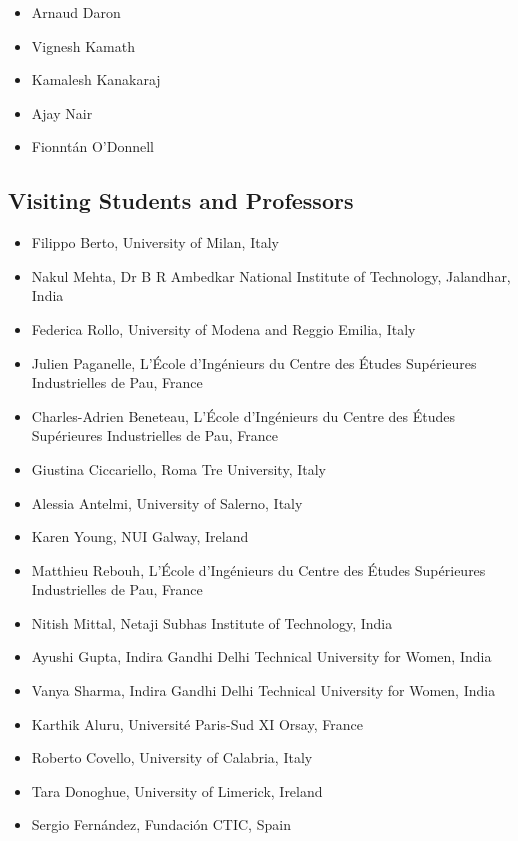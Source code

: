 \documentclass[10pt,a4paper]{res} %
\begin{document}
\begin{resume}
\begin{itemize} \itemsep -2pt
\item Arnaud Daron
\item Vignesh Kamath
\item Kamalesh Kanakaraj
\item Ajay Nair
\item Fionnt\'{a}n O'Donnell
\end{itemize}

\subsection*{Visiting Students and Professors}

\begin{itemize} \itemsep -2pt %
\item Filippo Berto, University of Milan, Italy
\item Nakul Mehta, Dr B R Ambedkar National Institute of Technology, Jalandhar, India
\item Federica Rollo, University of Modena and Reggio Emilia, Italy
\item Julien Paganelle, L'\'{E}cole d'Ing\'{e}nieurs du Centre des \'{E}tudes Sup\'{e}rieures Industrielles de Pau, France
\item Charles-Adrien Beneteau, L'\'{E}cole d'Ing\'{e}nieurs du Centre des \'{E}tudes Sup\'{e}rieures Industrielles de Pau, France
\item Giustina Ciccariello, Roma Tre University, Italy
\item Alessia Antelmi, University of Salerno, Italy
\item Karen Young, NUI Galway, Ireland
\item Matthieu Rebouh, L'\'{E}cole d'Ing\'{e}nieurs du Centre des \'{E}tudes Sup\'{e}rieures Industrielles de Pau, France
\item Nitish Mittal, Netaji Subhas Institute of Technology, India
\item Ayushi Gupta, Indira Gandhi Delhi Technical University for Women, India
\item Vanya Sharma, Indira Gandhi Delhi Technical University for Women, India
\item Karthik Aluru, Universit\'{e} Paris-Sud XI Orsay, France
\item Roberto Covello, University of Calabria, Italy
\item Tara Donoghue, University of Limerick, Ireland
\item Sergio Fern\'{a}ndez, Fundaci\'{o}n CTIC, Spain

\end{itemize}
\end{resume}
\end{document}
